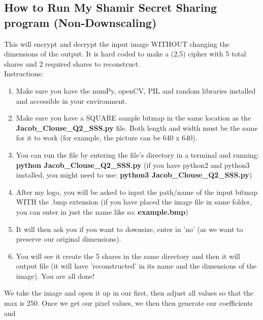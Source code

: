 \documentclass[10pt]{article}
\begin{document}
\subsection{How to Run My Shamir Secret Sharing program (Non-Downscaling) } 
\noindent This will encrypt and decrypt the input image WITHOUT changing the dimensions of the output. It is hard coded to make a (2,5) cipher with 5 total shares and 2 required shares to reconstruct. \\ Instructions: 
\begin{enumerate}
	\item Make sure you have the numPy, openCV, PIL and random libraries installed and accessible in your environment.
	
	\item Make sure you have a SQUARE sample bitmap in the same location as the \textbf{Jacob\_Clouse\_Q2\_SSS.py} file. Both length and width must be the same for it to work (for example, the picture can be 640 x 640).
	
	\item You can run the file by entering the file's directory in a terminal and running: \textbf{python Jacob\_Clouse\_Q2\_SSS.py} (if you have python2 and python3 installed, you might need to use: \textbf{python3 Jacob\_Clouse\_Q2\_SSS.py})
	
	\item After my logo, you will be asked to input the path/name of the input bitmap WITH the .bmp extension (if you have placed the image file in same folder, you can enter in just the name like so: \textbf{example.bmp})
	
	\item It will then ask you if you want to downsize, enter in 'no' (as we want to preserve our original dimensions). 
	
	\item You will see it create the 5 shares in the same directory and then it will output file (it will have 'reconstructed' in its name and the dimensions of the image). You are all done!
\end{enumerate}
\vspace{.1in}
\noindent We take the image and open it up in our first, then adjust all values so that the max is 250. Once we get our pixel values, we then then generate our coefficients and 
\vspace{0.2in}
\end{document}
